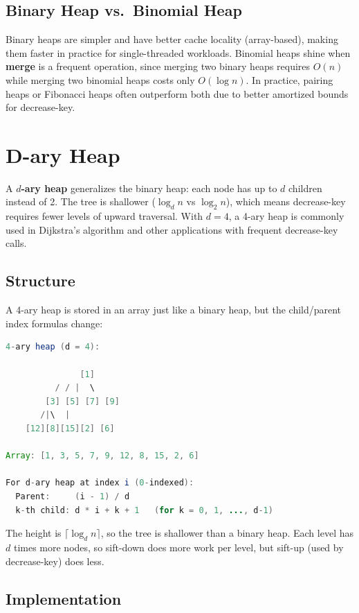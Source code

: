 \subsection{Binary Heap vs.\ Binomial Heap}

Binary heaps are simpler and have better cache locality (array-based), making them faster in practice for single-threaded workloads. Binomial heaps shine when \textbf{merge} is a frequent operation, since merging two binary heaps requires $O(n)$ while merging two binomial heaps costs only $O(\log n)$. In practice, pairing heaps or Fibonacci heaps often outperform both due to better amortized bounds for decrease-key.

\section{D-ary Heap}

A \textbf{$d$-ary heap} generalizes the binary heap: each node has up to $d$ children instead of 2. The tree is shallower ($\log_d n$ vs $\log_2 n$), which means decrease-key requires fewer levels of upward traversal. With $d = 4$, a 4-ary heap is commonly used in Dijkstra's algorithm and other applications with frequent decrease-key calls.

\subsection{Structure}

A 4-ary heap is stored in an array just like a binary heap, but the child/parent index formulas change:

\begin{lstlisting}[language=Java]
4-ary heap (d = 4):

               [1]
          / / |  \
        [3] [5] [7] [9]
       /|\  |
    [12][8][15][2] [6]

Array: [1, 3, 5, 7, 9, 12, 8, 15, 2, 6]

For d-ary heap at index i (0-indexed):
  Parent:     (i - 1) / d
  k-th child: d * i + k + 1   (for k = 0, 1, ..., d-1)
\end{lstlisting}

The height is $\lceil \log_d n \rceil$, so the tree is shallower than a binary heap. Each level has $d$ times more nodes, so sift-down does more work per level, but sift-up (used by decrease-key) does less.

\subsection{Implementation}

